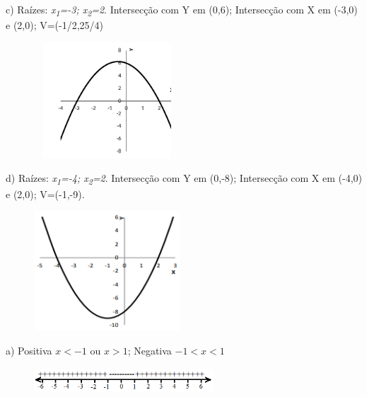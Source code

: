 \begin{enumerate}[label=\thechapter.\arabic*]
\begin{multicols}{2}
c) Raízes: \textit{x\textsubscript{1}=-3; x\textsubscript{2}=2}. Intersecção com Y em (0,6); Intersecção com X em (-3,0) e (2,0); V=(-1/2,25/4)

\begin{figure}[H]
	\begin{Center}
		\includegraphics[width=2.15in,height=1.71in]{capitulos/funcao_do_segundo_grau/media/image30.pdf}
	\end{Center}
\end{figure}
\end{multicols}

\begin{multicols}{2}
d) Raízes: \textit{x\textsubscript{1}=-4; x\textsubscript{2}=2}. Intersecção com Y em (0,-8); Intersecção com X em (-4,0) e (2,0);      V=(-1,-9).

\begin{figure}[H]
	\begin{Center}
		\includegraphics[width=2.15in,height=1.76in]{capitulos/funcao_do_segundo_grau/media/image31.png}
	\end{Center}
\end{figure}
\end{multicols}

\ansitem{}
\begin{multicols}{2}
a) Positiva $x<-1$ ou $x>1$; Negativa $-1 < x < 1$

\begin{figure}[H]
	\begin{Center}
		\includegraphics[width=2.65in,height=0.38in]{capitulos/funcao_do_segundo_grau/media/image32.png}
	\end{Center}
\end{figure}
\end{multicols}


\end{enumerate}
